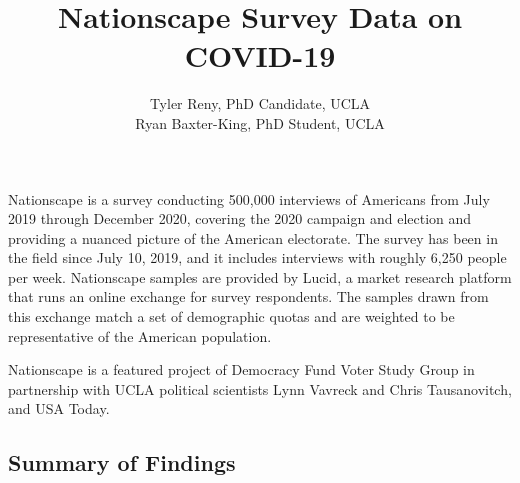 \documentclass[landscape]{article}
\title{Nationscape Survey Data on COVID-19}
\author{Tyler Reny, PhD Candidate, UCLA\\Ryan Baxter-King, PhD Student, UCLA}
\begin{document}
\maketitle

Nationscape is a survey conducting 500,000 interviews of Americans from July 2019 through December 2020, covering the 2020 campaign and election and providing a nuanced picture of the American electorate. The survey has been in the field since July 10, 2019, and it includes interviews with roughly 6,250 people per week. Nationscape samples are provided by Lucid, a market research platform that runs an online exchange for survey respondents. The samples drawn from this exchange match a set of demographic quotas and are weighted to be representative of the American population. 

Nationscape is a featured project of Democracy Fund Voter Study Group in partnership with UCLA political scientists Lynn Vavreck and Chris Tausanovitch, and USA Today.

\subsection*{Summary of Findings}
\end{document}
